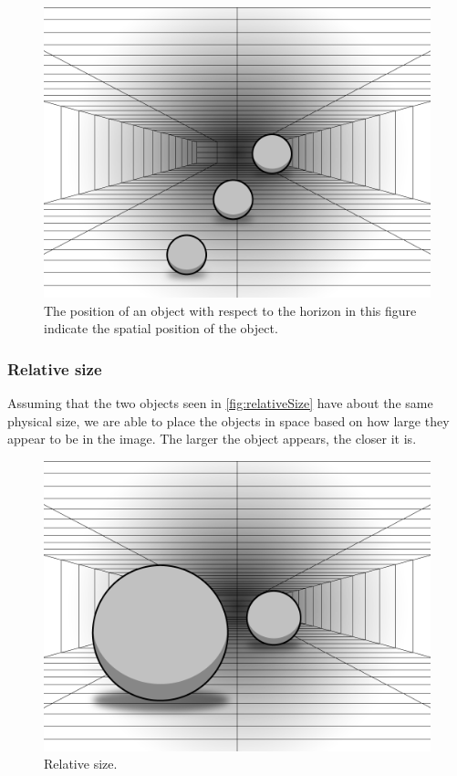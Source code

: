 \begin{figure}[H]
	\centering
	\includegraphics[width=1\linewidth]{figure/Analysis/relativeHeight.png}
	\caption{The position of an object with respect to the horizon in this figure indicate the spatial position of the object.}
	\label{fig:relativeHeight}
\end{figure}

\subsubsection{Relative size}
Assuming that the two objects seen in \autoref{fig:relativeSize} have about the same physical size, we are able to place the objects in space based on how large they appear to be in the image. The larger the object appears, the closer it is\citep{sensationPerception}.
\begin{figure}[H]
	\centering
	\includegraphics[width=1\linewidth]{figure/Analysis/relativeSize.png}
	\caption{Relative size.}
	\label{fig:relativeSize}
\end{figure}


